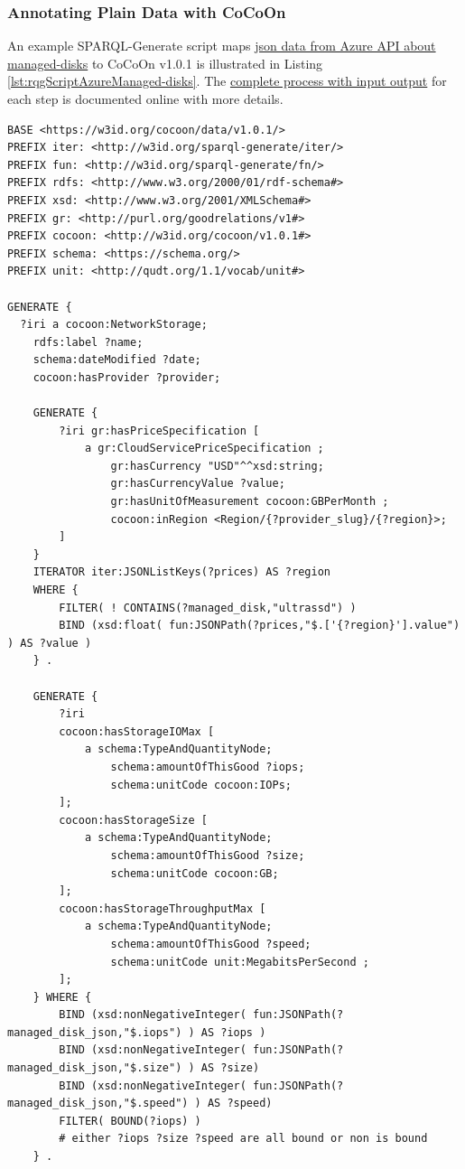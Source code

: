 \subsubsection{Annotating Plain Data with CoCoOn}
An example SPARQL-Generate script maps 
\href{https://azure.microsoft.com/api/v2/pricing/managed-disks/calculator/?culture=en-au&discount=mosp}{json data from Azure API about managed-disks}
to CoCoOn v1.0.1 is illustrated in Listing \ref{lst:rqgScriptAzureManaged-disks}.
The \href{https://github.com/miranda-zhang/cloud-computing-schema/blob/master/example/azure/storage.md}{complete process with input output} for each step is documented online with more details.

\begin{lstlisting}[caption={SPARQL-Generate script maps json data to ontologies},label={lst:rqgScriptAzureManaged-disks},language=sparql]
BASE <https://w3id.org/cocoon/data/v1.0.1/>
PREFIX iter: <http://w3id.org/sparql-generate/iter/>
PREFIX fun: <http://w3id.org/sparql-generate/fn/>
PREFIX rdfs: <http://www.w3.org/2000/01/rdf-schema#>
PREFIX xsd: <http://www.w3.org/2001/XMLSchema#>
PREFIX gr: <http://purl.org/goodrelations/v1#>
PREFIX cocoon: <http://w3id.org/cocoon/v1.0.1#>
PREFIX schema: <https://schema.org/>
PREFIX unit: <http://qudt.org/1.1/vocab/unit#>

GENERATE { 
  ?iri a cocoon:NetworkStorage;
    rdfs:label ?name;
    schema:dateModified ?date;
    cocoon:hasProvider ?provider;
    
    GENERATE {
        ?iri gr:hasPriceSpecification [ 
            a gr:CloudServicePriceSpecification ; 
                gr:hasCurrency "USD"^^xsd:string; 
                gr:hasCurrencyValue ?value;
                gr:hasUnitOfMeasurement cocoon:GBPerMonth ;
                cocoon:inRegion <Region/{?provider_slug}/{?region}>;
        ]
    }
  	ITERATOR iter:JSONListKeys(?prices) AS ?region
    WHERE {
        FILTER( ! CONTAINS(?managed_disk,"ultrassd") )
        BIND (xsd:float( fun:JSONPath(?prices,"$.['{?region}'].value") ) AS ?value )
    } .

    GENERATE {
        ?iri
        cocoon:hasStorageIOMax [
            a schema:TypeAndQuantityNode;
                schema:amountOfThisGood ?iops;
                schema:unitCode cocoon:IOPs;
        ];
        cocoon:hasStorageSize [
            a schema:TypeAndQuantityNode;
                schema:amountOfThisGood ?size;
                schema:unitCode cocoon:GB;
        ];
        cocoon:hasStorageThroughputMax [
            a schema:TypeAndQuantityNode;
                schema:amountOfThisGood ?speed;
                schema:unitCode unit:MegabitsPerSecond ;
        ];
    } WHERE {
        BIND (xsd:nonNegativeInteger( fun:JSONPath(?managed_disk_json,"$.iops") ) AS ?iops )
        BIND (xsd:nonNegativeInteger( fun:JSONPath(?managed_disk_json,"$.size") ) AS ?size)
        BIND (xsd:nonNegativeInteger( fun:JSONPath(?managed_disk_json,"$.speed") ) AS ?speed)        
        FILTER( BOUND(?iops) )
        # either ?iops ?size ?speed are all bound or non is bound
    } .


\end{lstlisting}
